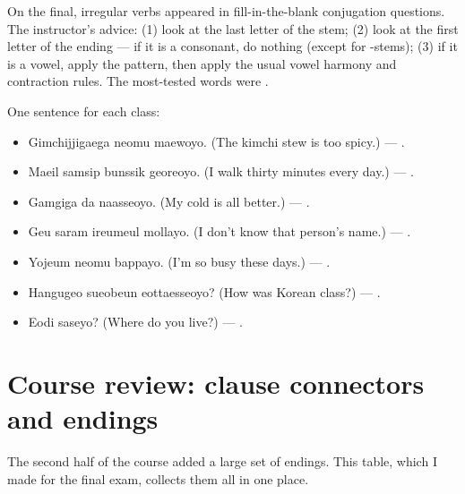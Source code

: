 \begin{important}
On the final, irregular verbs appeared in fill-in-the-blank conjugation questions. The
instructor's advice: (1) look at the last letter of the stem; (2) look at the first
letter of the ending --- if it is a consonant, do nothing (except for -stems);
(3) if it is a vowel, apply the pattern, then apply the usual vowel harmony and
contraction rules. The most-tested words were .
\end{important}

\begin{example}
One sentence for each class:
\begin{itemize}
  \item {} Gimchijjigaega neomu maewoyo. (The kimchi stew is
        too spicy.) --- .
  \item {} Maeil samsip bunssik georeoyo. (I walk thirty minutes
        every day.) --- .
  \item {} Gamgiga da naasseoyo. (My cold is all better.) ---
        .
  \item {} Geu saram ireumeul mollayo. (I don't know that
        person's name.) --- .
  \item {} Yojeum neomu bappayo. (I'm so busy these days.) ---
        .
  \item {} Hangugeo sueobeun eottaesseoyo? (How was Korean
        class?) --- .
  \item {} Eodi saseyo? (Where do you live?) --- .
\end{itemize}
\end{example}

\section{Course review: clause connectors and endings}

The second half of the course added a large set of endings. This table, which I made for
the final exam, collects them all in one place.


